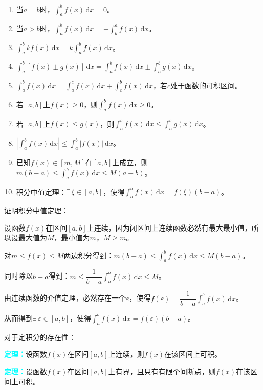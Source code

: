 \documentclass[UTF8, 12pt]{ctexart}
\begin{document}
\begin{enumerate}
    \item 当$a=b$时，$\int_a^bf(x)\,\textrm{d}x=0$。
    \item 当$a>b$时，$\int_a^bf(x)\,\textrm{d}x=-\int_b^af(x)\,\textrm{d}x$。
    \item $\int_a^bkf(x)\,\textrm{d}x=k\int_a^bf(x)\,\textrm{d}x$。
    \item $\int_a^b[f(x)\pm g(x)]\,\textrm{d}x=\int_a^bf(x)\,\textrm{d}x\pm\int_a^bg(x)\,\textrm{d}x$。
    \item $\int_a^bf(x)\,\textrm{d}x=\int_a^cf(x)\,\textrm{d}x+\int_c^bf(x)\,\textrm{d}x$，若$c$处于函数的可积区间。
    \item 若$[a,b]$上$f(x)\geqslant 0$，则$\int_a^bf(x)\,\textrm{d}x\geqslant 0$。
    \item 若$[a,b]$上$f(x)\leqslant g(x)$，则$\int_a^bf(x)\,\textrm{d}x\leqslant\int_a^bg(x)\,\textrm{d}x$。
    \item $\left\vert\int_a^bf(x)\,\textrm{d}x\right\vert\leqslant\int_a^b\vert f(x)\vert\,\textrm{d}x$。
    \item 已知$f(x)\in[m,M]$在$[a,b]$上成立，则$m(b-a)\leqslant\int_a^bf(x)\,\textrm{d}x\leqslant M(a-b)$。
    \item 积分中值定理：$\exists\,\xi\in[a,b]$，使得$\int_a^bf(x)\,\textrm{d}x=f(\xi)(b-a)$。
\end{enumerate}

证明积分中值定理：

设函数$f(x)$在区间$[a,b]$上连续，因为闭区间上连续函数必然有最大最小值，所以设最大值为$M$，最小值为$m$，$M\geqslant m$。

对$m\leqslant f(x)\leqslant M$两边积分得到：$m(b-a)\leqslant\int_a^bf(x)\,\textrm{d}x\leqslant M(b-a)$。

同时除以$b-a$得到：$m\leqslant\dfrac{1}{b-a}\int_a^bf(x)\,\textrm{d}x\leqslant M$。

由连续函数的介值定理，必然存在一个$\varepsilon$，使得$f(\varepsilon)=\dfrac{1}{b-a}\int_a^bf(x)\,\textrm{d}x$。

从而得到$\exists\,\varepsilon\in[a,b]$，使得$\int_a^bf(x)\,\textrm{d}x=f(\varepsilon)(b-a)$。

对于定积分的存在性：

\textcolor{aqua}{\textbf{定理：}}设函数$f(x)$在区间$[a,b]$上连续，则$f(x)$在该区间上可积。

\textcolor{aqua}{\textbf{定理：}}设函数$f(x)$在区间$[a,b]$上有界，且只有有限个间断点，则$f(x)$在该区间上可积。
\end{document}
